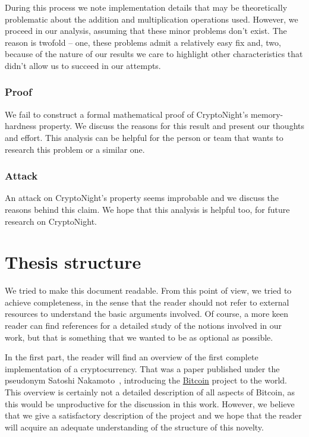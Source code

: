 During this process we note implementation details that may be theoretically problematic about the addition and multiplication operations used. However, we proceed in our analysis, assuming that these minor problems don't exist. The reason is twofold – one, these problems admit a relatively easy fix and, two, because of the nature of our results we care to highlight other characteristics that didn't allow us to succeed in our attempts.

\subsubsection{Proof}
We fail to construct a formal mathematical proof of CryptoNight's memory-hardness property. We discuss the reasons for this result and present our thoughts and effort. This analysis can be helpful for the person or team that wants to research this problem or a similar one.

\subsubsection{Attack}
An attack on CryptoNight's property seems improbable and we discuss the reasons behind this claim. We hope that this analysis is helpful too, for future research on CryptoNight.

\section{Thesis structure}
We tried to make this document readable. From this point of view, we tried to achieve completeness, in the sense that the reader should not refer to external resources to understand the basic arguments involved. Of course, a more keen reader can find references for a detailed study of the notions involved in our work, but that is something that we wanted to be as optional as possible.

In the first part, the reader will find an overview of the first complete implementation of a cryptocurrency. That was a paper published under the pseudonym Satoshi Nakamoto~\cite{Nakamoto_bitcoin:a}, introducing the \hyperref[sec:Bitcoin]{Bitcoin} project to the world. This overview is certainly not a detailed description of all aspects of Bitcoin, as this would be unproductive for the discussion in this work. However, we believe that we give a satisfactory description of the project and we hope that the reader will acquire an adequate understanding of the structure of this novelty.

